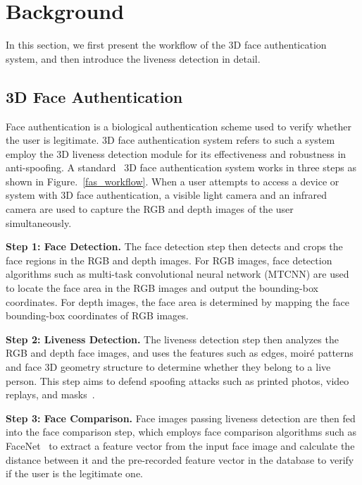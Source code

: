 \section{Background}
\label{sec:background}
In this section, we first present the workflow of the 3D face authentication system, and then introduce the liveness detection in detail.

\subsection{3D Face Authentication}
Face authentication is a biological authentication scheme used to verify whether the user is legitimate. 3D face authentication system refers to such a system employ the 3D liveness detection module for its effectiveness and robustness in anti-spoofing. A standard  3D face authentication system works in three steps as shown in Figure.~\ref{fas_workflow}. When a user attempts to access a device or system with 3D face authentication, a visible light camera and an infrared camera are used to capture the RGB and depth images of the user simultaneously.

\textbf{Step 1: Face Detection.} 
The face detection step then detects and crops the face regions in the RGB and depth images. For RGB images, face detection algorithms such as multi-task convolutional neural network (MTCNN) \cite{zhang2016joint} are used to locate the face area in the RGB images and output the bounding-box coordinates. For depth images, the face area is determined by mapping the face bounding-box coordinates of RGB images.

\textbf{Step 2: Liveness Detection.} The liveness detection step then analyzes the RGB and depth face images, and uses the features such as edges, moiré patterns and face 3D geometry structure to determine whether they belong to a live person. 
This step aims to defend spoofing attacks such as printed photos, video replays, and masks~\cite{chakka2011competition,anjos2011counter,raghavendra2015presentation, bhattacharjee2018spoofing, nesli2013spoofing}.

\textbf{Step 3: Face Comparison.} Face images passing liveness detection are then fed into the face comparison step, which employs face comparison algorithms such as FaceNet~\cite{schroff2015facenet} to extract a feature vector from the input face image and calculate the distance between it and the pre-recorded feature vector in the database to verify if the user is the legitimate one.


